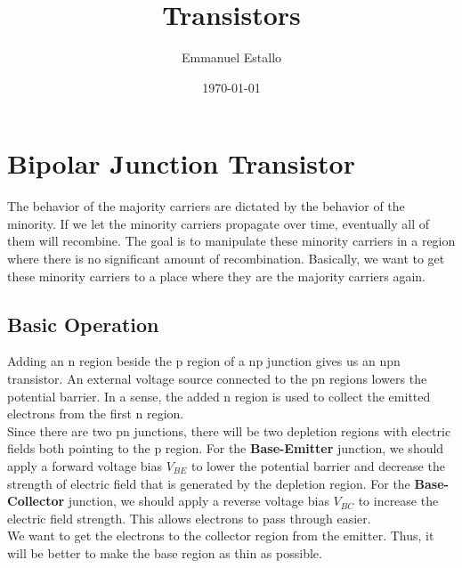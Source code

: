\documentclass{article}
\title{Transistors}
\author{Emmanuel Estallo}
\date{\today}
\begin{document}
\boldmath 
\maketitle 

\section{Bipolar Junction Transistor}
\noindent 
The behavior of the majority carriers are dictated by the behavior of the minority.
If we let the minority carriers propagate over time, eventually all of them will 
recombine. The goal is to manipulate these minority carriers in a region where there 
is no significant amount of recombination. Basically, we want to get these minority 
carriers to a place where they are the majority carriers again. 

\subsection{Basic Operation}
\noindent 
Adding an n region beside the p region of a np junction gives us an npn transistor.
An external voltage source connected to the pn regions lowers the potential barrier.
In a sense, the added n region is used to collect the emitted electrons from the first 
n region. 
\vspace{8pt}
\\ Since there are two pn junctions, there will be two depletion regions with electric
fields both pointing to the p region. For the \textbf{Base-Emitter} junction, we should 
apply a forward voltage bias $V_{BE}$ to lower the potential barrier and decrease the 
strength of electric field that is generated by the depletion region. For the 
\textbf{Base-Collector} junction, we should apply a reverse voltage bias $V_{BC}$ 
to increase the electric field strength. This allows electrons to pass through easier. 
\vspace{8pt}
\\ We want to get the electrons to the collector region from the emitter. Thus, it will
be better to make the base region as thin as possible. 
\end{document}
